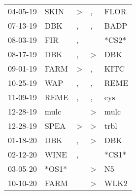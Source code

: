 \begin{supertabular}{p{0.07\textwidth}p{0.06\textwidth}p{0.02\textwidth}p{0.02\textwidth}p{0.06\textwidth}}
          04-05-19\textsuperscript{} &           SKIN\textsuperscript{} &     \textgreater &                , &           FLOR\textsuperscript{} \\
          07-13-19\textsuperscript{} &            DBK\textsuperscript{} &                , &                , &           BADP\textsuperscript{} \\
          08-03-19\textsuperscript{} &            FIR\textsuperscript{} &                , &                  &                            *CS2* \\
          08-17-19\textsuperscript{} &            DBK\textsuperscript{} &                , &     \textgreater &            DBK\textsuperscript{} \\
          09-01-19\textsuperscript{} &           FARM\textsuperscript{} &     \textgreater &                , &           KITC\textsuperscript{} \\
          10-25-19\textsuperscript{} &            WAP\textsuperscript{} &                , &                , &           REME\textsuperscript{} \\
          11-09-19\textsuperscript{} &           REME\textsuperscript{} &                , &                , &            cys\textsuperscript{} \\
          12-28-19\textsuperscript{} &           mulc\textsuperscript{} &                  &     \textgreater &           mulc\textsuperscript{} \\
          12-28-19\textsuperscript{} &           SPEA\textsuperscript{} &     \textgreater &     \textgreater &           trbl\textsuperscript{} \\
          01-18-20\textsuperscript{} &            DBK\textsuperscript{} &                , &     \textgreater &            DBK\textsuperscript{} \\
          02-12-20\textsuperscript{} &           WINE\textsuperscript{} &                , &                  &                            *CS1* \\
          03-05-20\textsuperscript{} &                            *OS1* &                  &     \textgreater &             N5\textsuperscript{} \\
          10-10-20\textsuperscript{} &           FARM\textsuperscript{} &                  &     \textgreater &           WLK2\textsuperscript{} \\
\end{supertabular}

